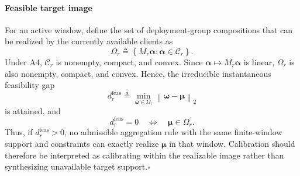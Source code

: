 \paragraph{Feasible target image}
For an active window, define the set of deployment-group compositions that can
be realized by the currently available clients as
\begin{equation}
 \Omega_r
 \triangleq
 \left\{
 M_r\boldsymbol\alpha:
 \boldsymbol\alpha\in\mathcal C_r
 \right\}.
 \label{eq:app_feasible_target_image}
\end{equation}
Under A4, $\mathcal C_r$ is nonempty, compact, and convex.  Since
$\boldsymbol\alpha\mapsto M_r\boldsymbol\alpha$ is linear, $\Omega_r$ is also
nonempty, compact, and convex.  Hence, the irreducible instantaneous
feasibility gap
\begin{equation}
 d_r^{\mathrm{feas}}
 \triangleq
 \min_{\boldsymbol\omega\in\Omega_r}
 \left\|
 \boldsymbol\omega-\boldsymbol\mu
 \right\|_2
 \label{eq:app_feasibility_gap}
\end{equation}
is attained, and
\begin{equation}
 d_r^{\mathrm{feas}}=0
 \quad\Longleftrightarrow\quad
 \boldsymbol\mu\in\Omega_r.
 \label{eq:app_exact_realizability}
\end{equation}
Thus, if $d_r^{\mathrm{feas}}>0$, no admissible aggregation rule with the same
finite-window support and constraints can exactly realize
$\boldsymbol\mu$ in that window.  Calibration should therefore be interpreted as
calibrating within the realizable image rather than synthesizing unavailable
target support.\hfill$\square$

